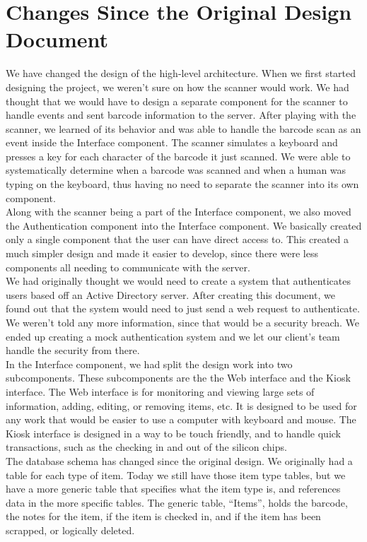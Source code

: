 \documentclass[10pt, onecolumn, twoside, peerreview]{IEEEtran}
\begin{document}
\section {Changes Since the Original Design Document}
We have changed the design of the high-level architecture. When we first started designing the project, we weren't sure on how the scanner would work. We had thought that we would have to design a separate component for the scanner to handle events and sent barcode information to the server. After playing with the scanner, we learned of its behavior and was able to handle the barcode scan as an event inside the Interface component. The scanner simulates a keyboard and presses a key for each character of the barcode it just scanned. We were able to systematically determine when a barcode was scanned and when a human was typing on the keyboard, thus having no need to separate the scanner into its own component.\\

Along with the scanner being a part of the Interface component, we also moved the Authentication component into the Interface component. We basically created only a single component that the user can have direct access to. This created a much simpler design and made it easier to develop, since there were less components all needing to communicate with the server.\\

We had originally thought we would need to create a system that authenticates users based off  an Active Directory server. After creating this document, we found out that the system would need to just send a web request to authenticate. We weren't told any more information, since that would be a security breach. We ended up creating a mock authentication system and we let our client's team handle the security from there.\\

In the Interface component, we had split the design work into two subcomponents. These subcomponents are the the Web interface and the Kiosk interface. The Web interface is for monitoring and viewing large sets of information, adding, editing, or removing items, etc. It is designed to be used for any work that would be easier to use a computer with keyboard and mouse. The Kiosk interface is designed in a way to be touch friendly, and to handle quick transactions, such as the checking in and out of the silicon chips.\\

The database schema has changed since the original design. We originally had a table for each type of item. Today we still have those item type tables, but we have a more generic table that specifies what the item type is, and references data in the more specific tables. The generic table, “Items”, holds the barcode, the notes for the item, if the item is checked in, and if the item has been scrapped, or logically deleted.\\
\end{document}
